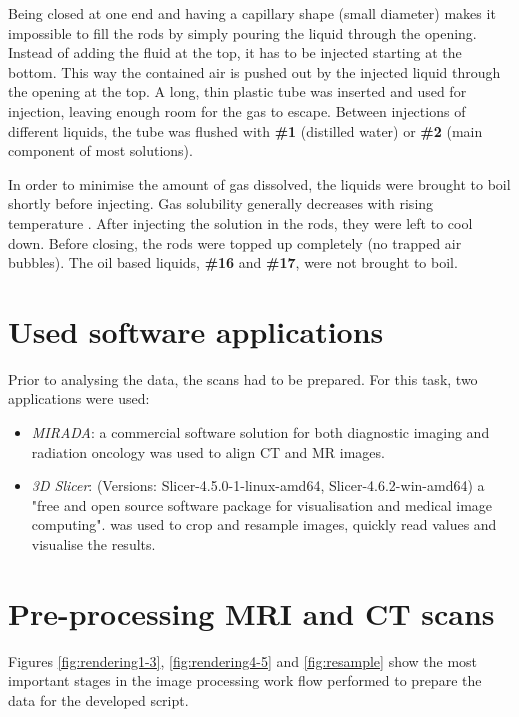 Being closed at one end and having a capillary shape (small diameter) makes it impossible to fill the rods by simply pouring the liquid through the opening.
Instead of adding the fluid at the top, it has to be injected starting at the bottom.
This way the contained air is pushed out by the injected liquid through the opening at the top.
A long, thin plastic tube was inserted and used for injection, leaving enough room for the gas to escape.
Between injections of different liquids, the tube was flushed with \textbf{\#1} (distilled water) or \textbf{\#2} (main component of most solutions).

In order to minimise the amount of gas dissolved, the liquids were brought to boil shortly before injecting. Gas solubility generally decreases with rising temperature \cite{Henry1803, Sander2015}.
After injecting the solution in the rods, they were left to cool down.
Before closing, the rods were topped up completely (no trapped air bubbles).
The oil based liquids, \textbf{\#16} and \textbf{\#17}, were not brought to boil.

\section{Used software applications}

Prior to analysing the data, the scans had to be prepared.
For this task, two applications were used:
\begin{itemize}
\item \textit{MIRADA}: a commercial software solution for both diagnostic imaging and radiation oncology \cite{mirada} was used to align CT and MR images.
\item \textit{3D Slicer}: (Versions: Slicer-4.5.0-1-linux-amd64, Slicer-4.6.2-win-amd64) a "free and open source software package for visualisation and medical image computing". \cite{3DSlicer, Kikinis2012} was used to crop and resample images, quickly read values and visualise the results.
\end{itemize}


\section{Pre-processing MRI and CT scans}
\label{sec:prep}

Figures \ref{fig:rendering1-3}, \ref{fig:rendering4-5} and \ref{fig:resample} show the most important stages in the image processing work flow performed to prepare the data for the developed script.

